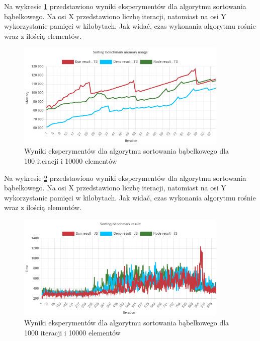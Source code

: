 Na wykresie \ref{fig:bubble_sorting_e5_memory_ts} przedstawiono wyniki eksperymentów dla algorytmu sortowania bąbelkowego. Na osi X przedstawiono liczbę iteracji, natomiast na osi Y wykorzystanie pamięci w kilobytach. Jak widać, czas wykonania algorytmu rośnie wraz z ilością elementów.
\begin{figure}[H]
  \centering
  \includegraphics[width=0.9\textwidth]{Figures/sorting/bubble/e5_memory_ts.png}
  \caption{Wyniki eksperymentów dla algorytmu sortowania bąbelkowego dla 100 iteracji i 10000 elementów}
  \label{fig:bubble_sorting_e5_memory_ts}
\end{figure}

Na wykresie \ref{fig:bubble_sorting_e6} przedstawiono wyniki eksperymentów dla algorytmu sortowania bąbelkowego. Na osi X przedstawiono liczbę iteracji, natomiast na osi Y wykorzystanie pamięci w kilobytach. Jak widać, czas wykonania algorytmu rośnie wraz z ilością elementów.
\begin{figure}[H]
  \centering
  \includegraphics[width=0.9\textwidth]{Figures/sorting/bubble/e6_js.png}
  \caption{Wyniki eksperymentów dla algorytmu sortowania bąbelkowego dla 1000 iteracji i 10000 elementów}
  \label{fig:bubble_sorting_e6}
\end{figure}

